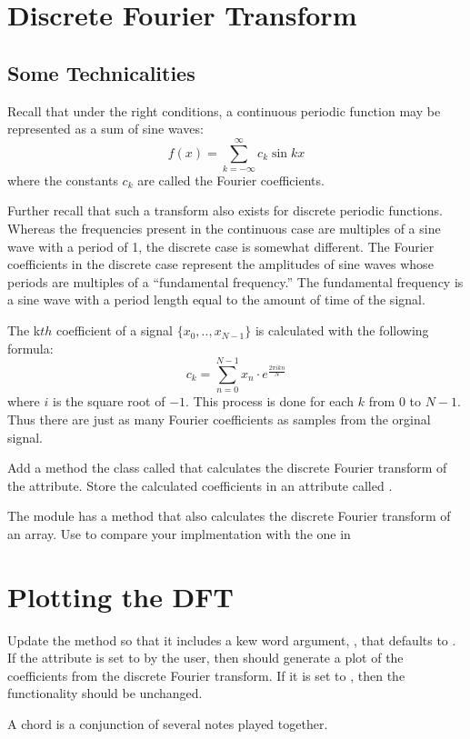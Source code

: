 \section*{Discrete Fourier Transform}

\subsection*{Some Technicalities}

Recall that under the right conditions, a continuous periodic function may be represented as a sum of sine waves:
\[
f(x) = \displaystyle{\sum_{k=-\infty}^{\infty}} c_k \sin{kx}
\]
where the constants $c_k$ are called the Fourier coefficients.

Further recall that such a transform also exists for discrete periodic functions.
Whereas the frequencies present in the continuous case are multiples of a sine wave with a period of 1, the discrete case is somewhat different.
The Fourier coefficients in the discrete case represent the amplitudes of sine waves whose periods are multiples of a ``fundamental frequency.''
The fundamental frequency is a sine wave with a period length equal to the amount of time of the signal.

The k$th$ coefficient of a signal $\{x_0, .., x_{N-1}\}$ is calculated with the following formula:
\[
c_k = \displaystyle{\sum_{n=0}^{N-1}} x_n \cdot e^{\frac{2\pi ikn}{N}}
\]
where $i$ is the square root of $-1$.
This process is done for each $k$ from $0$ to $N-1$.
Thus there are just as many Fourier coefficients as samples from the orginal signal.

\begin{problem}

Add a method the  class called  that calculates the discrete Fourier transform of the  attribute.
Store the calculated coefficients in an attribute called .

The  module has a  method that also calculates the discrete Fourier transform of an array.
Use  to compare your implmentation with the one in 
\end{problem}

\section*{Plotting the DFT}

\begin{problem}

Update the  method so that it includes a kew word argument, , that defaults to .
If the  attribute is set to  by the user, then  should generate a plot of the coefficients from the discrete Fourier transform.
If it is set to , then the functionality should be unchanged.

\end{problem}

\begin{problem}

A chord is a conjunction of several notes played together.

\end{problem}

